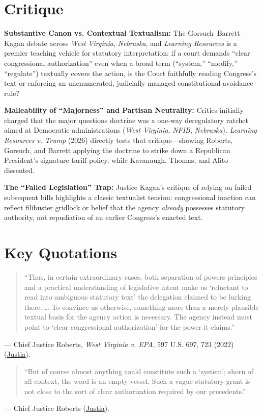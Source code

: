 \documentclass[12pt]{article}
\begin{document}
\section{Critique}
\textbf{Substantive Canon vs. Contextual Textualism:} The Gorsuch--Barrett--Kagan debate across \textit{West Virginia}, \textit{Nebraska}, and \textit{Learning Resources} is a premier teaching vehicle for statutory interpretation: if a court demands ``clear congressional authorization'' even when a broad term (``system,'' ``modify,'' ``regulate'') textually covers the action, is the Court faithfully reading Congress's text or enforcing an unenumerated, judicially managed constitutional avoidance rule?

\textbf{Malleability of ``Majorness'' and Partisan Neutrality:} Critics initially charged that the major questions doctrine was a one-way deregulatory ratchet aimed at Democratic administrations (\textit{West Virginia}, \textit{NFIB}, \textit{Nebraska}). \textit{Learning Resources v. Trump} (2026) directly tests that critique---showing Roberts, Gorsuch, and Barrett applying the doctrine to strike down a Republican President's signature tariff policy, while Kavanaugh, Thomas, and Alito dissented.

\textbf{The ``Failed Legislation'' Trap:} Justice Kagan's critique of relying on failed subsequent bills highlights a classic textualist tension: congressional inaction can reflect filibuster gridlock or belief that the agency \textit{already} possesses statutory authority, not repudiation of an earlier Congress's enacted text.

\section{Key Quotations}
\begin{quote}
``Thus, in certain extraordinary cases, both separation of powers principles and a practical understanding of legislative intent make us `reluctant to read into ambiguous statutory text' the delegation claimed to be lurking there. \dots{} To convince us otherwise, something more than a merely plausible textual basis for the agency action is necessary. The agency instead must point to `clear congressional authorization' for the power it claims.''
\end{quote}
\noindent --- Chief Justice Roberts, \textit{West Virginia v. EPA}, 597 U.S. 697, 723 (2022) (\href{https://supreme.justia.com/cases/federal/us/597/20-1530/}{Justia}).

\begin{quote}
``But of course almost anything could constitute such a `system'; shorn of all context, the word is an empty vessel. Such a vague statutory grant is not close to the sort of clear authorization required by our precedents.''
\end{quote}
\noindent --- Chief Justice Roberts (\href{https://supreme.justia.com/cases/federal/us/597/20-1530/}{Justia}).
\end{document}
